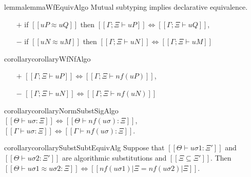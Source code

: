 \begin{restatable}{lemma}{lemmaWfEquivAlgo}
    \label{lemma:wf-equiv-algo}
    Mutual subtyping implies declarative equivalence.
    \begin{itemize}
    \item[$+$] if $[[uP ≈ uQ]]$ then $[[Γ; Ξ ⊢ uP]] \iff [[Γ; Ξ ⊢ uQ]]$,
    \item[$-$] if $[[uN ≈ uM]]$ then $[[Γ; Ξ ⊢ uN]] \iff [[Γ; Ξ ⊢ uM]]$
    \end{itemize}
\end{restatable}

\begin{restatable}{corollary}{corollaryWfNfAlgo}
    \label{corollary:wf-nf-algo}
    \hfill\\
    \begin{itemize}
        \item[$+$] $[[Γ; Ξ ⊢ uP]] \iff [[Γ; Ξ ⊢ nf(uP)]]$,
        \item[$-$] $[[Γ; Ξ ⊢ uN]] \iff [[Γ; Ξ ⊢ nf(uN)]]$
    \end{itemize}
\end{restatable}


\begin{restatable}{corollary}{corollaryNormSubstSigAlgo}
    \label{corollary:norm-subst-sig-algo}
    \hfill\\
    $[[Θ ⊢ uσ : Ξ]] \iff [[Θ ⊢ nf(uσ) : Ξ]]$,
    $[[Γ ⊢ uσ : Ξ]] \iff [[Γ ⊢ nf(uσ) : Ξ]]$.
\end{restatable}


\begin{restatable}{corollary}{corollarySubstSubtEquivAlg}
    \label{corollary:subst-subt-equiv-algorithmization}
    Suppose that $[[Θ ⊢ uσ1 : Ξ']]$ and $[[Θ ⊢ uσ2 : Ξ']]$ are algorithmic substitutions
    and $[[Ξ ⊆ Ξ']]$. 
    Then $[[Θ ⊢ uσ1 ≈ uσ2 : Ξ]] \iff [[nf(uσ1)|Ξ = nf(uσ2)|Ξ]]$.
\end{restatable}

